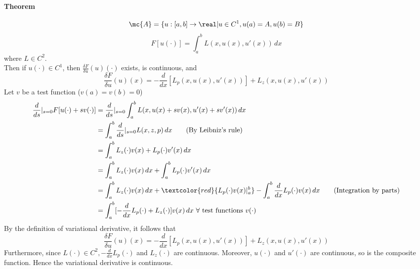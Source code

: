 \documentclass[11pt]{article}
\begin{document}
\paragraph{Theorem}
$$\mc{A} = \{ u: [a,b] \rightarrow \real | u \in C^1, u(a) = A, u(b) = B\}$$
$$F[u(\cdot)] = \int_a^b L(x,u(x),u'(x))\, dx$$
where $L \in C^2$. \\
Then if $u(\cdot) \in C^1$, then
$\frac{\delta F}{\delta u}(u)(\cdot)$ exists, is continuous, and
$$\frac{\delta F}{\delta u}(u)(x) = -\frac{d}{dx}[L_p(x,u(x),u'(x))] + L_z(x,u(x),u'(x))$$
	Let $v$ be a test function ($v(a) = v(b) = 0$)
	\begin{align}
		\frac{d}{ds} |_{s=0} F[u(\cdot) + sv(\cdot)] 
		&= \frac{d}{ds}|_{s=0}\int_a^b L(x, u(x) + sv(x), u'(x) + sv'(x)) \, dx \\
		&= \int_a^b \frac{d}{ds}|_{s=0} L(x,z,p)\, dx \tag{By Leibniz's rule}\\
		&= \int_a^b L_z(\cdot)v(x) + L_p(\cdot)v'(x)\, dx \\
		&= \int_a^b L_z(\cdot)v(x) \, dx + \int_a^b L_p(\cdot)v'(x)\, dx \\
		&= \int_a^b L_z(\cdot)v(x) \, dx + \textcolor{red}{L_p(\cdot)v(x)|_a^b} - \int_a^b \frac{d}{dx}L_p(\cdot)v(x) \, dx \tag{Integration by parts} \\
		&= \int_a^b [-\frac{d}{dx}L_p(\cdot) + L_z(\cdot)]v(x) \, dx \text{  $\forall$ test functions $v(\cdot)$} 
	\end{align}
	By the definition of variational derivative, it follows that 
	$$\frac{\delta F}{\delta u}(u)(x) = -\frac{d}{dx}[L_p(x,u(x),u'(x))] + L_z(x,u(x),u'(x))$$
	Furthermore, since $L(\cdot) \in C^2, -\frac{d}{dx}L_p(\cdot)$ and $L_z(\cdot)$ are  continuous. Moreover, $u(\cdot)$ and $u'(\cdot)$ are continuous, so is the composite function. Hence the variational derivative is continuous. 
\end{document}
